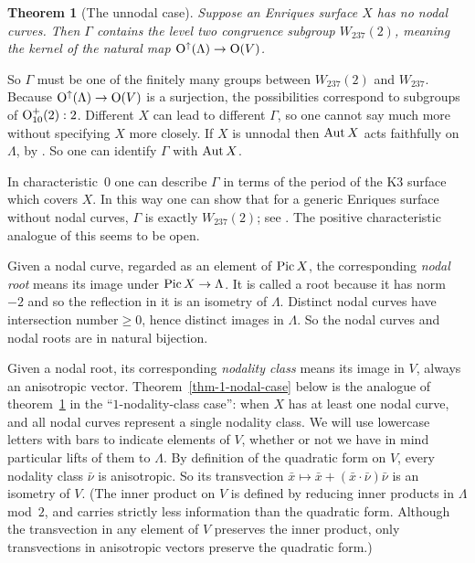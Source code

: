 \documentclass[12pt]{amsart}
\def\Pic{\mathop{\rm Pic}\nolimits}
\def\Aut{\mathop{\rm Aut}\nolimits}
\def\Orth{{\rm O}}
\def\Oup{\Orth^{\uparrow}}
\def\xbar{{\bar{x}}}
\def\nubar{{\bar{\nu}}}
\newtheorem{theorem}{Theorem}
\numberwithin{theorem}{section}
\numberwithin{equation}{section}
\numberwithin{figure}{section}
\theoremstyle{remark}
\begin{document}
\begin{theorem}[The unnodal case]
\label{thm-unnodal-case}
Suppose an Enriques surface $X$ has no nodal curves.  Then
$\Gamma$ contains the level two congruence subgroup $W_{237}(2)$,
meaning the kernel of the natural map $\Oup(\Lambda)\to\Orth(V)$.
\end{theorem}

So $\Gamma$ must be one of the finitely many groups between
$W_{237}(2)$ and $W_{237}$.  Because $\Oup(\Lambda)\to\Orth(V)$ is a
surjection, the possibilities correspond to subgroups of
$\Orth_{10}^+(2):2$.  Different $X$ can lead to different $\Gamma$, so
one cannot say much more without specifying $X$ more closely.  
If $X$ is unnodal then $\Aut X$ acts faithfully on $\Lambda$, by
\cite[Thm.\ 7.3.6]{CD-new}.  So one can identify $\Gamma$ with $\Aut X$.

In characteristic~$0$ one can describe $\Gamma$ in terms of the period
of the K3 surface which covers $X$.  In this way one can show that for
a generic Enriques surface without nodal curves, $\Gamma$ is exactly
$W_{237}(2)$; see \cite{Barth-Peters}.  The positive characteristic
analogue of this seems to be open.

\medskip
Given a nodal curve, regarded as an element of $\Pic X$, the
corresponding {\it nodal root} means its image under $\Pic
X\to\Lambda$.  It is called a root because it has norm~$-2$ and so the
reflection in it is an isometry of $\Lambda$.  Distinct nodal curves
have intersection number${}\geq0$, hence distinct images in
$\Lambda$.  So the nodal curves and nodal roots are in natural
bijection.

Given a nodal root, its corresponding {\it nodality class} means its
image in $V$, always an anisotropic vector.  Theorem~\ref{thm-1-nodal-case} below is
the analogue of theorem~\ref{thm-unnodal-case} in the ``$1$-nodality-class case'': when $X$ has
at least one nodal curve, and all nodal curves represent a single
nodality class.
We will use lowercase letters with bars to
indicate elements of $V$, whether or not we have in mind particular
lifts of them to $\Lambda$.  By definition of the quadratic form on
$V$, every nodality class $\nubar$ is anisotropic.  So its transvection
$\xbar\mapsto\xbar+(\xbar\cdot\nubar)\nubar$ is an isometry of $V$.
(The inner product on $V$ is defined by reducing inner products in $\Lambda$ mod~$2$,
	and carries strictly less information than the quadratic form.  Although the
	transvection in any element of $V$ preserves the inner product, only
	transvections in anisotropic vectors preserve the quadratic form.)
\end{document}
